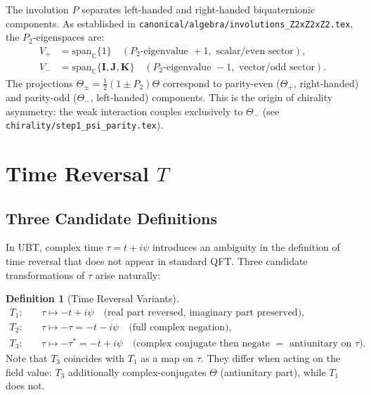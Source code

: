 \documentclass[12pt,a4paper]{article}
\theoremstyle{definition}
\newtheorem{definition}[theorem]{Definition}
\theoremstyle{remark}
\begin{document}
The involution $P$ separates left-handed and right-handed biquaternionic
components.  As established in
\texttt{canonical/algebra/involutions\_Z2xZ2xZ2.tex}, the $P_2$-eigenspaces
are:
\begin{align}
  V_+ &= \mathrm{span}_\mathbb{C}\{1\}
        \quad (P_2\text{-eigenvalue }+1,\text{ scalar/even sector}), \\
  V_- &= \mathrm{span}_\mathbb{C}\{\mathbf{I},\mathbf{J},\mathbf{K}\}
        \quad (P_2\text{-eigenvalue }-1,\text{ vector/odd sector}).
\end{align}
The projections
$\Theta_\pm = \tfrac{1}{2}(1 \pm P_2)\Theta$
correspond to parity-even ($\Theta_+$, right-handed)
and parity-odd ($\Theta_-$, left-handed) components.
This is the origin of chirality asymmetry: the weak interaction couples
exclusively to $\Theta_-$ (see \texttt{chirality/step1\_psi\_parity.tex}).

\section{Time Reversal $T$}
\label{sec:sym:T}

\subsection{Three Candidate Definitions}

In UBT, complex time $\tau = t + i\psi$ introduces an ambiguity in the
definition of time reversal that does not appear in standard QFT.
Three candidate transformations of $\tau$ arise naturally:

\begin{definition}[Time Reversal Variants]
\label{def:sym:T_variants}
\begin{align}
  T_1: &\quad \tau \mapsto -t + i\psi
        \quad \text{(real part reversed, imaginary part preserved)},
        \label{eq:sym:T1} \\
  T_2: &\quad \tau \mapsto -\tau = -t - i\psi
        \quad \text{(full complex negation)},
        \label{eq:sym:T2} \\
  T_3: &\quad \tau \mapsto -\tau^* = -t + i\psi
        \quad \text{(complex conjugate then negate $=$ antiunitary on $\tau$)}.
        \label{eq:sym:T3}
\end{align}
Note that $T_3$ coincides with $T_1$ as a map on $\tau$.
They differ when acting on the field value: $T_3$ additionally complex-conjugates
$\Theta$ (antiunitary part), while $T_1$ does not.
\end{definition}
\end{document}
